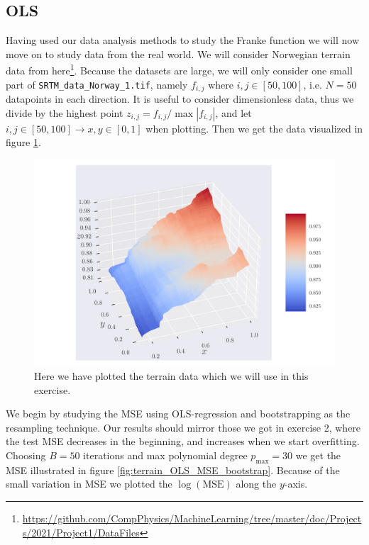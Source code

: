 \documentclass[reprint,english,notitlepage,aps,nobalancelastpage,nofootinbib]{revtex4-1}  %
\begin{document}
\subsection*{OLS}
Having used our data analysis methods to study the Franke function we will now move on to study data from the real world. We will consider Norwegian terrain data from here\footnote{\href{https://github.com/CompPhysics/MachineLearning/tree/master/doc/Projects/2021/Project1/DataFiles}{https://github.com/CompPhysics/MachineLearning/tree/master/doc/Projects/2021/Project1/DataFiles}}. Because the datasets are large, we will only consider one small part of \texttt{SRTM\_data\_Norway\_1.tif}, namely $f_{i,j}$ where $i,j\in[50,100]$, i.e. $N=50$ datapoints in each direction. It is useful to consider dimensionless data, thus we divide by the highest point $z_{i,j} = f_{i,j}/\max{|f_{i,j}|}$, and let $i,j\in[50,100] \rightarrow x,y\in[0,1]$ when plotting. Then we get the data visualized in figure \ref{fig:terrain_raw}.

\begin{figure}[H]
  \includegraphics[width=\linewidth]{SRTM_rawdata_n50.pdf}
  \caption{Here we have plotted the terrain data which we will use in this exercise.}
  \label{fig:terrain_raw}
\end{figure}

We begin by studying the MSE using OLS-regression and bootstrapping as the resampling technique. Our results should mirror those we got in exercise 2, where the test MSE decreases in the beginning, and increases when we start overfitting. Choosing $B = 50$ iterations and max polynomial degree $p_\text{max} = 30$ we get the MSE illustrated in figure \ref{fig:terrain_OLS_MSE_bootstrap}. Because of the small variation in MSE we plotted the $\log(\text{MSE})$ along the $y$-axis.
\end{document}
